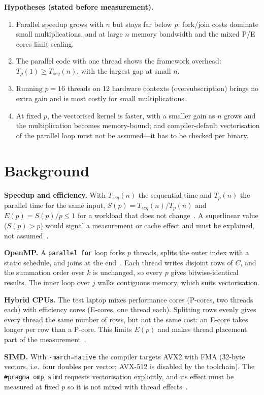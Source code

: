 \documentclass[11pt,a4paper]{article}
\begin{document}
\textbf{Hypotheses (stated before measurement).}
\begin{enumerate}
  \item[H1:] Parallel speedup grows with $n$ but stays far below $p$:
        fork/join costs dominate small multiplications, and at large $n$
        memory bandwidth and the mixed P/E cores limit scaling.
  \item[H2:] The parallel code with one thread shows the framework
        overhead: $T_p(1) \ge T_{seq}(n)$, with the largest gap at small
        $n$.
  \item[H3:] Running $p=16$ threads on 12 hardware contexts
        (oversubscription) brings no extra gain and is most costly for
        small multiplications.
  \item[H4:] At fixed $p$, the vectorised kernel is faster, with a smaller
        gain as $n$ grows and the multiplication becomes memory-bound; and
        compiler-default vectorisation of the parallel loop must not be
        assumed---it has to be checked per binary.
\end{enumerate}

\section{Background}

\textbf{Speedup and efficiency.}
With $T_{seq}(n)$ the sequential time and $T_p(n)$ the parallel time for
the same input, $S(p)=T_{seq}(n)/T_p(n)$ and $E(p)=S(p)/p \le 1$ for a
workload that does not change~\cite{fleming1986,mytkowicz2009}. A
superlinear value ($S(p)>p$) would signal a measurement or cache effect and
must be explained, not assumed~\cite{mytkowicz2009}.

\textbf{OpenMP.}
A \texttt{parallel for} loop forks $p$ threads, splits the outer index with
a static schedule, and joins at the end~\cite{openmp}. Each thread writes
disjoint rows of $C$, and the summation order over $k$ is unchanged, so
every $p$ gives bitwise-identical results. The inner loop over $j$ walks
contiguous memory, which suits vectorisation.

\textbf{Hybrid CPUs.}
The test laptop mixes performance cores (P-cores, two threads each) with
efficiency cores (E-cores, one thread each). Splitting rows evenly gives
every thread the same number of rows, but not the same cost: an E-core
takes longer per row than a P-core. This limits $E(p)$ and makes thread
placement part of the measurement~\cite{intelwapl}.

\textbf{SIMD.}
With \texttt{-march=native} the compiler targets AVX2 with FMA (32-byte
vectors, i.e.\ four doubles per vector; AVX-512 is disabled by the
toolchain). The \texttt{\#pragma omp simd} requests vectorisation
explicitly, and its effect must be measured at fixed $p$ so it is not mixed
with thread effects~\cite{intelig}.
\end{document}
